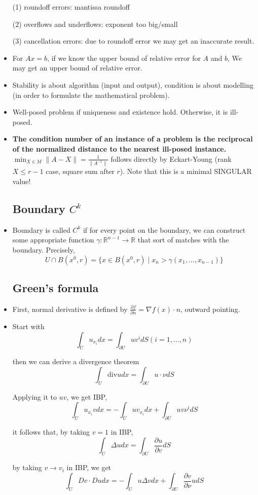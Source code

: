 \documentclass{article}
\theoremstyle{remark}
\begin{document}
\begin{itemize}
(1) roundoff errors: mantissa roundoff

(2) overflows and underflows: exponent too big/small

(3) cancellation errors: due to roundoff error we may get an inaccurate result. 

\item For $Ax=b$, if we know the upper bound of relative error for $A$ and $b$, We may get an upper bound of relative error.
\item Stability is about algorithm (input and output), condition is about modelling (in order to formulate the mathematical problem).
\item Well-posed problem if uniqueness and existence hold. Otherwise, it is ill-posed. 
\item \textbf{The condition number of an instance of a problem is the reciprocal of the normalized distance to the nearest ill-posed instance.}
$\min_{X\in M}\lVert A-X\rVert=\frac 1{\lVert A^{-1}\rVert}$ follows directly by Eckart-Young (rank$X\leq r-1$ case, square sum after $r$). Note that this is a minimal SINGULAR value!
\subsection*{Boundary $C^k$}
\item Boundary is called $C^k$ if for every point on the boundary, we can construct some appropriate function $\gamma:\mathbb{R}^{n-1}\to\mathbb{R}$ that sort of matches with the boundary. Precisely, $$U\cap B(x^0, r)=\{x\in B(x^0, r)\mid x_n >\gamma(x_1, \dots, x_{n-1})\}$$
\subsection*{Green's formula}
\item First, normal derivative is defined by $\frac{\partial f}{\partial n}=\nabla f(x)\cdot n$, outward pointing.
\item Start with $$\int_U u_{x_i}dx=\int_{\partial U}uv^i dS (i=1, \dots, n)$$

then we can derive a divergence theorem $$\int_U \text{div} udx=\int_{\partial U}u\cdot \nu dS$$

Applying it to $uv$, we get IBP, $$\int_U u_{x_i}v dx=-\int_U uv_{x_i}dx+\int_{\partial U}uv\nu^i dS$$

it follows that, by taking $v=1$ in IBP, $$\int_U \Delta udx=\int_{\partial U}\frac{\partial u}{\partial v}dS$$

by taking $v\to v_i$ in IBP, we get $$\int_U Dv\cdot Du dx=-\int_U u\Delta vdx+\int_{\partial U}\frac{\partial v}{\partial \nu}udS$$


\end{itemize}
\end{document}
